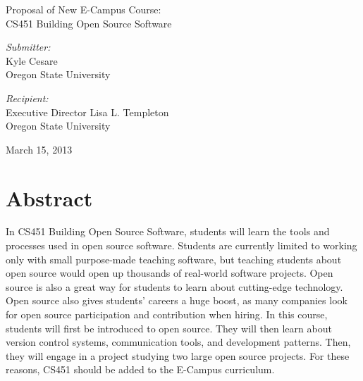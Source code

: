 \documentclass[12pt,letterpaper]{article}
\begin{document}
\begin{titlepage}
  \begin{center}
    {\LARGE Proposal of New E-Campus Course:\\CS451 Building Open Source Software} \\[2cm]

    \begin{minipage}{0.4\textwidth}
      \begin{flushleft}
        \emph{Submitter:} \\
        Kyle Cesare \\
        Oregon State University \\
      \end{flushleft}
    \end{minipage}
    \begin{minipage}{0.4\textwidth}
      \begin{flushleft}
        \emph{Recipient:} \\
        Executive Director Lisa L. Templeton \\
        Oregon State University \\
      \end{flushleft}
    \end{minipage}

    \vfill

    March 15, 2013

  \end{center}
\end{titlepage}

\pagestyle{myheadings}
\setcounter{page}{2}

\setcounter{secnumdepth}{0}

\section{Abstract}
In CS451 Building Open Source Software, students will learn the tools and
processes used in open source software.  Students are currently limited to
working only with small purpose-made teaching software, but teaching students
about open source would open up thousands of real-world software projects.  Open
source is also a great way for students to learn about cutting-edge technology.
Open source also gives students' careers a huge boost, as many companies look
for open source participation and contribution when hiring.  In this course,
students will first be introduced to open source.  They will then learn about
version control systems, communication tools, and development patterns.  Then,
they will engage in a project studying two large open source projects.  For
these reasons, CS451 should be added to the E-Campus curriculum.
\end{document}
